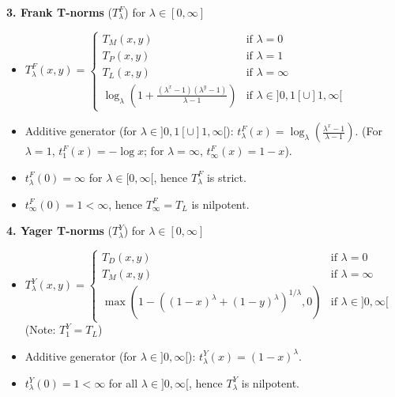 \begin{example}
\textbf{3. Frank T-norms} ($T_\lambda^F$) for $\lambda \in [0, \infty]$ 
\begin{itemize}
    \item $T_\lambda^F(x,y) = \begin{cases} T_M(x,y) & \text{if } \lambda = 0 \\ T_P(x,y) & \text{if } \lambda = 1 \\ T_L(x,y) & \text{if } \lambda = \infty \\ \log_\lambda \left(1 + \frac{(\lambda^x-1)(\lambda^y-1)}{\lambda-1}\right) & \text{if } \lambda \in ]0, 1[ \cup ]1, \infty[ \end{cases}$
    \item Additive generator (for $\lambda \in ]0, 1[ \cup ]1, \infty[$): $t_\lambda^F(x) = \log_\lambda \left(\frac{\lambda^x-1}{\lambda-1}\right)$. (For $\lambda=1$, $t_1^F(x) = -\log x$; for $\lambda=\infty$, $t_\infty^F(x) = 1-x$).
    \item $t_\lambda^F(0) = \infty$ for $\lambda \in [0, \infty[$, hence $T_\lambda^F$ is strict.
    \item $t_\infty^F(0) = 1 < \infty$, hence $T_\infty^F = T_L$ is nilpotent.
\end{itemize}

\textbf{4. Yager T-norms} ($T_\lambda^Y$) for $\lambda \in [0, \infty]$
\begin{itemize}
    \item $T_\lambda^Y(x,y) = \begin{cases} T_D(x,y) & \text{if } \lambda = 0 \\ T_M(x,y) & \text{if } \lambda = \infty \\ \max\left(1 - ((1-x)^\lambda + (1-y)^\lambda)^{1/\lambda}, 0\right) & \text{if } \lambda \in ]0, \infty[ \end{cases}$
    (Note: $T_1^Y = T_L$)
    \item Additive generator (for $\lambda \in ]0, \infty[$): $t_\lambda^Y(x) = (1-x)^\lambda$.
    \item $t_\lambda^Y(0) = 1 < \infty$ for all $\lambda \in ]0, \infty[$, hence $T_\lambda^Y$ is nilpotent.
\end{itemize}


\end{example}
